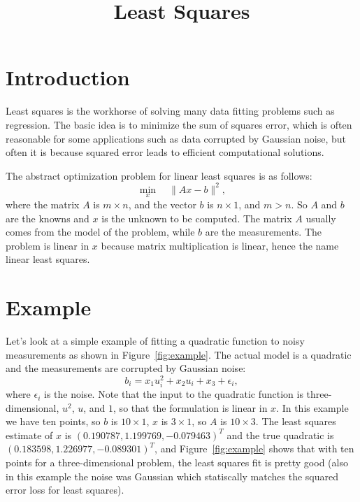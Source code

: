 \documentclass{article}
\begin{document}
\title{Least Squares}
\author{}
\date{}
\maketitle

\section{Introduction}

Least squares is the workhorse of solving many data fitting problems such as regression.  The basic idea is to minimize the sum of squares error, which is often reasonable for some applications such as data corrupted by Gaussian noise, but often it is because squared error leads to efficient computational solutions.

The abstract optimization problem for linear least squares is as follows:
\begin{equation}
\min_x \quad \lVert{Ax - b}\rVert^2,
\end{equation}
where the matrix $A$ is $m \times n$, and the vector $b$ is $n \times 1$, and $m > n$.  So $A$ and $b$ are the knowns and $x$ is the unknown to be computed.  The matrix $A$ usually comes from the model of the problem, while $b$ are the measurements.  The problem is linear in $x$ because matrix multiplication is linear, hence the name linear least squares.

\section{Example}

Let's look at a simple example of fitting a quadratic function to noisy measurements as shown in Figure~\ref{fig:example}.  The actual model is a quadratic and the measurements are corrupted by Gaussian noise:
\begin{equation}
b_i = x_1 u_i^2 + x_2 u_i + x_3 + \epsilon_i,
\end{equation}
where $\epsilon_i$ is the noise.  Note that the input to the quadratic function is three-dimensional, $u^2$, $u$, and $1$, so that the formulation is linear in $x$.  In this example we have ten points, so $b$ is $10 \times 1$, $x$ is $3 \times 1$, so $A$ is $10 \times 3$.  The least squares estimate of $x$ is $(0.190787, 1.199769, -0.079463)^T$ and the true quadratic is $(0.183598, 1.226977, -0.089301)^T$, and Figure~\ref{fig:example} shows that with ten points for a three-dimensional problem, the least squares fit is pretty good (also in this example the noise was Gaussian which statiscally matches the squared error loss for least squares).
\end{document}
